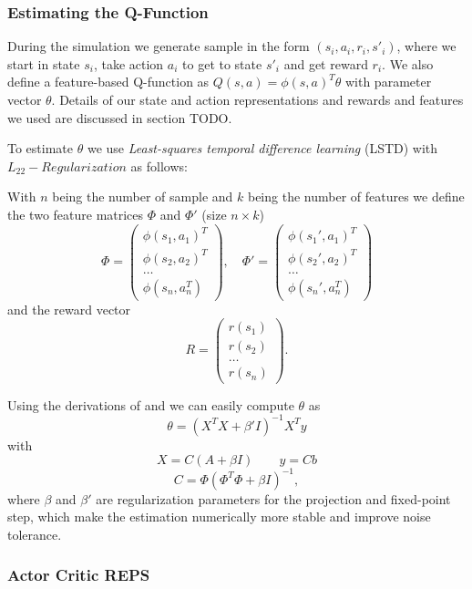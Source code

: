 \documentclass[twoside]{article}
\begin{document}
\subsubsection{Estimating the Q-Function}
During the simulation we generate sample in the form $(s_i, a_i, r_i, s'_i)$,
where we start in state $s_i$, take action $a_i$ to get to state $s'_i$ and
get reward $r_i$. We also define a feature-based Q-function as $Q(s, a) =
\phi(s,a)^T \theta$ with parameter vector $\theta$. Details of our state and
action representations and rewards and features we used are discussed in section
TODO.

To estimate $\theta$ we use \emph{Least-squares temporal difference
learning} (LSTD) with $L_{22}-Regularization$\cite{lstdRegularization} as
follows:

With $n$ being the number of sample and $k$ being the number of features
we define the two feature matrices $\Phi$ and $\Phi'$ (size $n\times k$)
$$\Phi = \left(
\begin{array}{c} \phi(s_1,a_1)^T \\ \phi(s_2,a_2)^T \\ \dots \\ \phi(s_n, a_n^T)
\end{array} \right), \quad
\Phi' = \left( \begin{array}{c} \phi(s_1',a_1)^T \\

\phi(s_2',a_2)^T \\ \dots \\ \phi(s_n', a_n^T) \end{array} \right)$$ and the
reward vector
$$R = \left( \begin{array}{c} r(s_1) \\ r(s_2) \\ \dots \\ r(s_n) \end{array} \right).$$

Using the derivations of \cite{lspi} and \cite{lstdRegularization} we can easily
compute $\theta$ as
$$\theta = (X^TX+\beta'I)^{-1}X^Ty$$ with
$$X = C(A+\beta I) \qquad y=Cb$$ $$C = \Phi(\Phi^T\Phi+\beta I)^{-1},$$
where $\beta$ and $\beta'$ are regularization parameters for the projection and
fixed-point step, which make the estimation numerically more stable and improve
noise tolerance.

\subsubsection{Actor Critic REPS}
\end{document}
